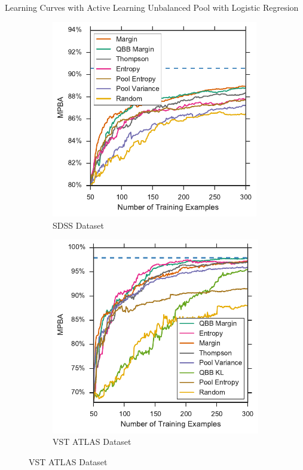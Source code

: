 \documentclass{beamer}
\begin{document}
\begin{frame}{Learning Curves with Active Learning}
	Unbalanced Pool with Logistic Regresion
	\begin{figure}[tbp]
		\centering
		\begin{subfigure}{.5\textwidth}
			\centering
			\includegraphics[width=0.99\textwidth]{../thesis/figures/5_active/sdss_ul_ind_upper}
			\caption{SDSS Dataset}
		\end{subfigure}%
		\begin{subfigure}{.5\textwidth}
			\centering
			\includegraphics[width=0.99\linewidth]{../thesis/figures/5_active/vstatlas_ul_ind_upper}
			\caption{VST ATLAS Dataset}
		\end{subfigure}
	\end{figure}
\end{frame}
\end{document}
